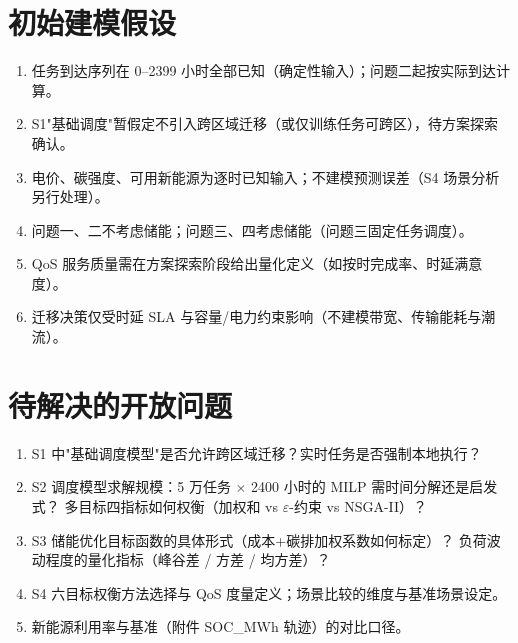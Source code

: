 \documentclass{internal-report}
\begin{document}
\section{初始建模假设}

\begin{enumerate}
  \item 任务到达序列在 0--2399 小时全部已知（确定性输入）；问题二起按实际到达计算。
  \item S1"基础调度"暂假定不引入跨区域迁移（或仅训练任务可跨区），待方案探索确认。
  \item 电价、碳强度、可用新能源为逐时已知输入；不建模预测误差（S4 场景分析另行处理）。
  \item 问题一、二不考虑储能；问题三、四考虑储能（问题三固定任务调度）。
  \item QoS 服务质量需在方案探索阶段给出量化定义（如按时完成率、时延满意度）。
  \item 迁移决策仅受时延 SLA 与容量/电力约束影响（不建模带宽、传输能耗与潮流）。
\end{enumerate}

\section{待解决的开放问题}

\begin{enumerate}
  \item S1 中"基础调度模型"是否允许跨区域迁移？实时任务是否强制本地执行？
  \item S2 调度模型求解规模：5 万任务 × 2400 小时的 MILP 需时间分解还是启发式？
        多目标四指标如何权衡（加权和 vs $\varepsilon$-约束 vs NSGA-II）？
  \item S3 储能优化目标函数的具体形式（成本+碳排加权系数如何标定）？
        负荷波动程度的量化指标（峰谷差 / 方差 / 均方差）？
  \item S4 六目标权衡方法选择与 QoS 度量定义；场景比较的维度与基准场景设定。
  \item 新能源利用率与基准（附件 SOC\_MWh 轨迹）的对比口径。
\end{enumerate}
\end{document}
